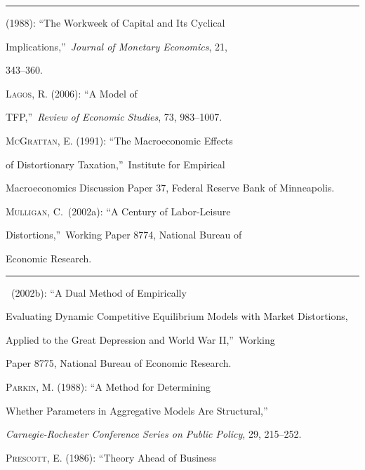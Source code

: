 \documentclass[fleqn,leqno,11pt]{article}
\begin{document}
\rule[-0.02in]{0.81in}{0.2pt}


(1988): \textquotedblleft The Workweek of Capital and Its Cyclical

Implications,\textquotedblright\ \textit{Journal of Monetary Economics}, 21,

343--360.



\textsc{Lagos, R.} (2006): \textquotedblleft A Model of

TFP,\textquotedblright\ \emph{Review of Economic Studies}, 73, 983--1007.



\textsc{McGrattan, E.} (1991): \textquotedblleft The Macroeconomic Effects

of Distortionary Taxation,\textquotedblright\ Institute for Empirical

Macroeconomics Discussion Paper 37, Federal Reserve Bank of Minneapolis.



\textsc{Mulligan, C.}\ (2002a): \textquotedblleft A Century of Labor-Leisure

Distortions,\textquotedblright\ Working Paper 8774, National Bureau of

Economic Research.





\rule[-0.02in]{0.81in}{0.2pt}%


\textbf{\ }(2002b): \textquotedblleft A Dual Method of Empirically

Evaluating Dynamic Competitive Equilibrium Models with Market Distortions,

Applied to the Great Depression and World War II,\textquotedblright\ Working

Paper 8775, National Bureau of Economic Research.



\textsc{Parkin, M.} (1988): \textquotedblleft A Method for Determining

Whether Parameters in Aggregative Models Are Structural,\textquotedblright\ 

\textit{Carnegie-Rochester Conference Series on Public Policy}, 29, 215--252.



\textsc{Prescott, E.} (1986): \textquotedblleft Theory Ahead of Business
\end{document}
